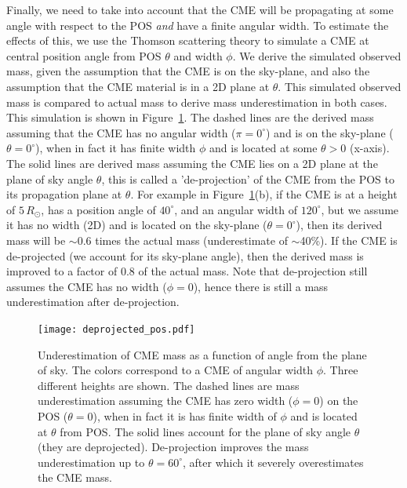 Finally, we need to take into account that the CME will be propagating at some angle with respect to the POS \emph{and} have a finite angular width. To estimate the effects of this, we use the Thomson scattering theory to simulate a CME at central position angle from POS $\theta$ and width $\phi$. We derive the simulated observed mass, given the assumption that the CME is on the sky-plane, and also the assumption that the CME material is in a 2D plane at $\theta$. This simulated observed mass is compared to actual mass to derive mass underestimation in both cases.
This simulation is shown in Figure~\ref{fig:deprojection}. The dashed lines are the derived mass assuming that the CME has no angular width ($\pi=0^{\circ}$) and is on the sky-plane ($\theta=0^{\circ}$), when in fact it has finite width $\phi$ and is located at some $\theta >0$ (x-axis). The solid lines are derived mass assuming the CME lies on a 2D plane at the plane of sky angle $\theta$, this is called a 'de-projection' of the CME from the POS to its propagation plane at $\theta$. For example in Figure~\ref{fig:deprojection}(b), if the CME is at a height of $5\,R_{\odot}$, has a position angle of $40^{\circ}$, and an angular width of $120^{\circ}$, but we assume it has no width (2D) and is located on the sky-plane ($\theta=0^{\circ}$), then its derived mass will be $\sim$0.6 times the actual mass (underestimate of $\sim$40\%). If the CME is de-projected (we account for its sky-plane angle), then the derived mass is improved to a factor of 0.8 of the actual mass. Note that de-projection still assumes the CME has no width ($\phi=0$), hence there is still a mass underestimation after de-projection.
\begin{figure}[!ht]
\begin{center}
\texttt{[image: deprojected\_pos.pdf]}
\caption{Underestimation of CME mass as a function of angle from the plane of sky. The colors correspond to a CME of angular width $\phi$. Three different heights are shown. The dashed lines are mass underestimation assuming the CME has zero width ($\phi=0$) on the POS ($\theta=0$), when in fact it is has finite width of $\phi$ and is located at $\theta$ from POS. The solid lines account for the plane of sky angle $\theta$ (they are deprojected). De-projection improves the mass underestimation up to $\theta=60^{\circ}$, after which it severely overestimates the CME mass.}
\label{fig:deprojection}
\end{center}
\end{figure}
\clearpage

